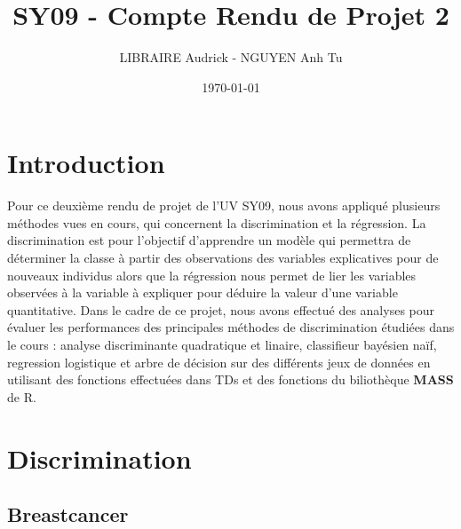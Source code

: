 \documentclass[a4paper,11pt,oneside,roman]{article}
\title{SY09 - Compte Rendu de Projet 2}
\author{LIBRAIRE Audrick - NGUYEN Anh Tu}
\date{\today}
\begin{document}
\maketitle

\tableofcontents \newpage
\section{Introduction}
Pour ce deuxième rendu de projet de l’UV SY09, nous avons appliqué plusieurs méthodes vues en cours, qui concernent la discrimination et la régression. La discrimination est pour l’objectif d’apprendre un modèle qui permettra de déterminer la classe à partir des observations des variables explicatives pour de nouveaux individus alors que la régression nous permet de lier les variables observées à la variable à expliquer pour déduire la valeur d'une variable quantitative. Dans le cadre de ce projet, nous avons effectué des analyses pour évaluer les performances des principales méthodes de discrimination étudiées dans le cours : analyse discriminante quadratique et linaire, classifieur bayésien naïf, regression logistique et arbre de décision sur des différents jeux de données en utilisant des fonctions effectuées dans TDs et des fonctions du biliothèque \textbf{MASS} de R. 

\section{Discrimination}
\subsection{Breastcancer}
\end{document}
